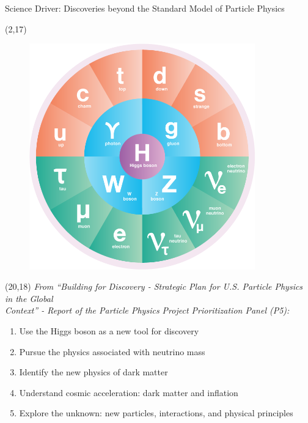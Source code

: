 \documentclass[final]{beamer}
\begin{document}
\begin{frame}{}
\begin{textblock}{80.0}
\begin{block}{Science Driver: Discoveries beyond the Standard Model of Particle Physics}
\begin{textblock}{16.0}(2,17)
\begin{figure}[H]
\includegraphics[width=0.87\textwidth]{images/standard_model_ai.png}
\end{figure}
\end{textblock}

\begin{textblock}{50.0}(20,18)
{\it From ``Building for Discovery - Strategic Plan for U.S. Particle Physics in the Global \\
Context'' - Report of the Particle Physics Project Prioritization Panel (P5):}

\begin{center}
\begin{enumerate}
\item Use the Higgs boson as a new tool for discovery
\item Pursue the physics associated with neutrino mass
\item Identify the new physics of dark matter
\item Understand cosmic acceleration: dark matter and inflation
\item Explore the unknown: new particles, interactions, and physical principles
\end{enumerate}
\end{center}
\end{textblock}


\end{block}
\end{textblock}
\end{frame}
\end{document}

